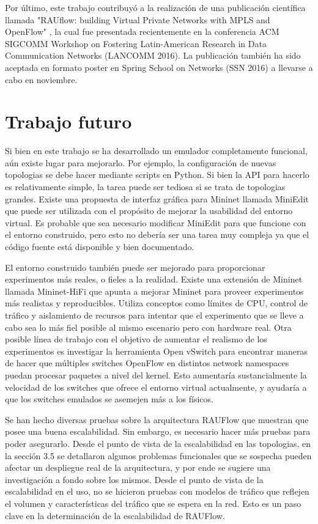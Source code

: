 Por último, este trabajo contribuyó a la realización de una publicación científica llamada "RAUflow: building Virtual Private Networks with MPLS and OpenFlow" \cite{rauflow}, la cual fue presentada recientemente en la conferencia ACM SIGCOMM Workshop on Fostering Latin-American Research in Data Communication Networks (LANCOMM 2016). La publicación también ha sido aceptada en formato poster en Spring School on Networks (SSN 2016) a llevarse a cabo en noviembre.


\section{Trabajo futuro}

Si bien en este trabajo se ha desarrollado un emulador completamente funcional, aún existe lugar para mejorarlo. Por ejemplo, la configuración de nuevas topologias se debe hacer mediante scripts en Python. Si bien la API para hacerlo es relativamente simple, la tarea puede ser tediosa si se trata de topologias grandes. Existe una propuesta de interfaz gráfica para Mininet llamada MiniEdit \cite{miniedit} que puede ser utilizada con el propósito de mejorar la usabilidad del entorno virtual. Es probable que sea necesario modificar MiniEdit para que funcione con el entorno construido, pero esto no debería ser una tarea muy compleja ya que el código fuente está disponible y bien documentado.

El entorno construido también puede ser mejorado para proporcionar experimentos más reales, o fieles a la realidad. Existe una extensión de Mininet llamada Mininet-HiFi \cite{mininet-hifi} que apunta a mejorar Mininet para proveer experimentos más realistas y reproducibles. Utiliza conceptos como límites de CPU, control de tráfico y aislamiento de recursos para intentar que el experimento que se lleve a cabo sea lo más fiel posible al mismo escenario pero con hardware real.
Otra posible línea de trabajo con el objetivo de aumentar el realismo de los experimentos es investigar la herramienta Open vSwitch para encontrar maneras de hacer que múltiples switches OpenFlow en distintos network namespaces puedan procesar paquetes a nivel del kernel. Esto aumentaría sustancialmente la velocidad de los switches que ofrece el entorno virtual actualmente, y ayudaría a que los switches emulados se asemejen más a los físicos.

Se han hecho diversas pruebas sobre la arquitectura RAUFlow que muestran que posee una buena escalabilidad. Sin embargo, es necesario hacer más pruebas para poder asegurarlo. Desde el punto de vista de la escalabilidad en las topologias, en la sección 3.5 se detallaron algunos problemas funcionales que se sospecha pueden afectar un despliegue real de la arquitectura, y por ende se sugiere una investigación a fondo sobre los mismos. Desde el punto de vista de la escalabilidad en el uso, no se hicieron pruebas con modelos de tráfico que reflejen el volumen y características del tráfico que se espera en la red. Esto es un paso clave en la determinación de la escalabilidad de RAUFlow.

